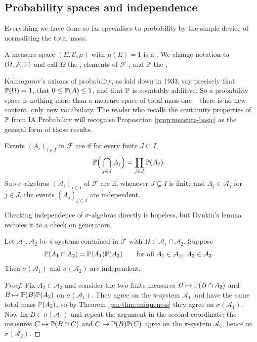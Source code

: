 \documentclass[a4paper]{scrartcl}
\newcommand{\cA}{\mathcal{A}}
\newcommand{\cE}{\mathcal{E}}
\newcommand{\cF}{\mathcal{F}}
\begin{document}
\subsection{Probability spaces and independence}

Everything we have done so far specialises to probability by the simple device of normalising the total mass.

\begin{definition}
	A measure space $(E, \cE, \mu)$ with $\mu(E) = 1$ is a . We change notation to $(\Omega, \cF, \PP)$ and call $\Omega$ the , elements of $\cF$ , and $\mathbb{P}$ the .
\end{definition}

Kolmogorov's axioms of probability, as laid down in 1933, say precisely that $\mathbb{P}(\Omega)=1$, that $0 \leq \mathbb{P}(A) \leq 1$, and that $\mathbb{P}$ is countably additive. So a probability space is nothing more than a measure space of total mass one -- there is no new content, only new vocabulary. The reader who recalls the continuity properties of $\mathbb{P}$ from IA Probability will recognise Proposition \ref{prop:measure-basic} as the general form of those results.

\begin{definition}[Independence]
	Events $(A_i)_{i \in I}$ in $\cF$ are  if for every finite $J \subseteq I$,
	$$
	\mathbb{P}\Big( \bigcap_{j\in J} A_j \Big) = \prod_{j \in J} \mathbb{P}(A_j).
	$$
	Sub-$\sigma$-algebras $(\cA_i)_{i \in I}$ of $\cF$ are  if, whenever $J \subseteq I$ is finite and $A_j \in \cA_j$ for $j \in J$, the events $(A_j)_{j \in J}$ are independent.
\end{definition}

Checking independence of $\sigma$-algebras directly is hopeless, but Dynkin's lemma reduces it to a check on generators.

\begin{proposition}\label{prop:indep-pi}
	Let $\cA_1, \cA_2$ be $\pi$-systems contained in $\cF$ with $\Omega \in \cA_1 \cap \cA_2$. Suppose
	$$
	\PP(A_1 \cap A_2) = \PP(A_1)\PP(A_2) \qquad \text{for all } A_1 \in \cA_1, \; A_2 \in \cA_2.
	$$
	Then $\sigma(\cA_1)$ and $\sigma(\cA_2)$ are independent.
\end{proposition}
\begin{proof}
	Fix $A_2 \in \cA_2$ and consider the two finite measures $B \mapsto \mathbb{P}(B \cap A_2)$ and $B \mapsto \mathbb{P}(B)\mathbb{P}(A_2)$ on $\sigma(\cA_1)$. They agree on the $\pi$-system $\cA_1$ and have the same total mass $\mathbb{P}(A_2)$, so by Theorem \ref{pm-thm:uniqueness} they agree on $\sigma(\cA_1)$. Now fix $B \in \sigma(\cA_1)$ and repeat the argument in the second coordinate: the measures $C \mapsto \mathbb{P}(B \cap C)$ and $C \mapsto \mathbb{P}(B)\mathbb{P}(C)$ agree on the $\pi$-system $\cA_2$, hence on $\sigma(\cA_2)$.
\end{proof}
\end{document}
